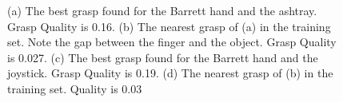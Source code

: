 \begin{figure}
  \centering

 \caption{\scriptsize{(a) The best grasp found for the Barrett hand and the ashtray. Grasp Quality is 0.16. (b) The nearest grasp of (a) in the training set. Note the gap between the finger and the object. Grasp Quality is 0.027. (c) The best grasp found for the Barrett hand and the joystick. Grasp Quality is 0.19. (d) The nearest grasp of (b) in the training set. Quality is 0.03 }
}
    \label{near}
\end{figure}


